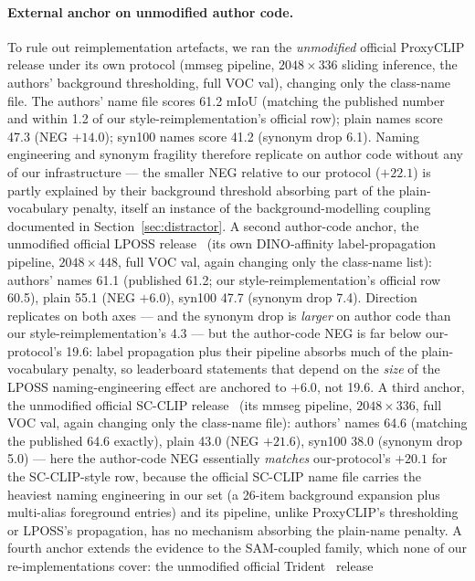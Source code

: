 \documentclass[11pt]{article}
\newcommand{\miou}{mIoU}
\begin{document}
\paragraph{External anchor on unmodified author code.}\label{sec:anchor} To rule out
reimplementation artefacts, we ran the \emph{unmodified} official ProxyCLIP
release under its own protocol (mmseg pipeline, $2048{\times}336$ sliding
inference, the authors' background thresholding, full VOC val), changing only
the class-name file. The authors' name file scores 61.2 \miou{} (matching the
published number and within 1.2 of our style-reimplementation's official
row); plain names score 47.3 (NEG $+14.0$); syn100 names score 41.2 (synonym
drop 6.1). Naming engineering and synonym fragility therefore replicate on
author code without any of our infrastructure --- the smaller NEG relative to
our protocol ($+22.1$) is partly explained by their background threshold
absorbing part of the plain-vocabulary penalty, itself an instance of the
background-modelling coupling documented in
Section~\ref{sec:distractor}. A second author-code anchor, the unmodified
official LPOSS release~\citep{stojnic2025lposs} (its own DINO-affinity label-propagation pipeline,
$2048{\times}448$, full VOC val, again changing only the class-name list):
authors' names 61.1 (published 61.2; our style-reimplementation's official row
60.5), plain 55.1 (NEG $+6.0$), syn100 47.7 (synonym drop 7.4). Direction
replicates on both axes --- and the synonym drop is \emph{larger} on author
code than our style-reimplementation's 4.3 --- but the author-code NEG is far
below our-protocol's 19.6: label propagation plus their pipeline absorbs much
of the plain-vocabulary penalty, so leaderboard statements that depend on the
\emph{size} of the LPOSS naming-engineering effect are anchored to $+6.0$, not
19.6. A third anchor, the unmodified official SC-CLIP release~\citep{bai2024scclip} (its mmseg
pipeline, $2048{\times}336$, full VOC val, again changing only the class-name
file): authors' names 64.6 (matching the published 64.6 exactly), plain 43.0
(NEG $+21.6$), syn100 38.0 (synonym drop 5.0) --- here the author-code NEG
essentially \emph{matches} our-protocol's $+20.1$ for the SC-CLIP-style row,
because the official SC-CLIP name file carries the heaviest naming
engineering in our set (a 26-item background expansion plus multi-alias
foreground entries) and its pipeline, unlike ProxyCLIP's thresholding or
LPOSS's propagation, has no mechanism absorbing the plain-name penalty.
A fourth anchor extends the evidence to the SAM-coupled family, which none
of our re-implementations cover: the unmodified official Trident~\cite{shi2025trident} release
\end{document}
